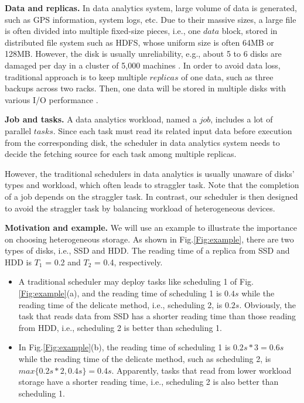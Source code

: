 \documentclass[conference]{IEEEtran}
\begin{document}
\textbf{Data and replicas.} In data analytics system, large volume of data is generated, such as GPS information\cite{b38}, system logs\cite{b39}, etc. Due to their massive sizes, a large file is often divided into multiple fixed-size pieces, i.e., one $data$ block, stored in distributed file system such as HDFS\cite{b19}, whose uniform size is often 64MB or 128MB. However, the disk is usually unreliability, e.g., about 5 to 6 disks are damaged per day in a cluster of 5,000 machines \cite{b32}. In order to avoid data loss, traditional approach is to keep multiple $replicas$ of one data, such as three backups across two racks. Then, one data will be stored in multiple disks with various I/O performance \cite{b43}. 

\textbf{Job and tasks.} A data analytics workload, named a $job$, includes a lot of parallel $tasks$. Since each task must read its related input data before execution from the corresponding disk, the scheduler in data analytics system needs to decide the fetching source for each task among multiple replicas. 


However, the traditional schedulers in data analytics is usually unaware of disks' types and workload, which often leads to straggler task. Note that the completion of a job depends on the straggler task. In contrast, our scheduler is then designed to avoid the straggler task by balancing workload of heterogeneous devices.

\textbf{Motivation and example.}
We will use an example to illustrate the importance on choosing heterogeneous storage. As shown in Fig.\ref{Fig:example}, there are two types of disks, i.e., SSD and HDD. The reading time of a replica from SSD and HDD is $T_1$ = 0.2 and $T_2$ = 0.4, respectively. 
\begin{itemize}
	\item A traditional scheduler may deploy tasks like scheduling 1 of Fig.\ref{Fig:example}(a), and the reading time of scheduling 1 is $0.4s$ while the reading time of the delicate method, i.e., scheduling 2, is $0.2s$. Obviously, the task that reads data from SSD has a shorter reading time than those reading from HDD, i.e., scheduling 2 is better than scheduling 1. 
	\item In Fig.\ref{Fig:example}(b), the reading time of scheduling 1 is $0.2s * 3 = 0.6s$ while the reading time of the delicate method, such as scheduling 2, is $max\{0.2s * 2, 0.4s\} = 0.4s$. Apparently, tasks that read from lower workload storage have a shorter reading time, i.e., scheduling 2 is also better than scheduling 1.
\end{itemize}
\end{document}
